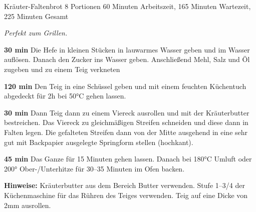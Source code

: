 \begin{recipe}{Kräuter-Faltenbrot} {8 Portionen} {60 Minuten Arbeitszeit, 165 Minuten Wartezeit, 225 Minuten Gesamt}

  \freeform
  \textit{Perfekt zum Grillen.}

  \textbf{30 min}
  Die Hefe in kleinen Stücken in lauwarmes Wasser geben und im Wasser auflösen.
  Danach den Zucker ins Wasser geben.
  Anschließend Mehl, Salz und Öl zugeben und zu einem Teig verkneten

  \newstep
  \textbf{120 min}
  Den Teig in eine Schüssel geben und mit einem feuchten Küchentuch abgedeckt für 2h bei 50°C gehen lassen.

  \textbf{30 min}
  Dann Teig dann zu einem Viereck ausrollen und mit der Kräuterbutter bestreichen.
  Das Viereck zu gleichmäßigen Streifen schneiden und diese dann in Falten legen.
  Die gefalteten Streifen dann von der Mitte ausgehend in eine sehr gut mit Backpapier ausgelegte Springform stellen (hochkant).

  \newstep
  \textbf{45 min}
  Das Ganze für 15 Minuten gehen lassen.
  Danach bei 180°C Umluft oder 200° Ober-/Unterhitze für 30--35 Minuten im Ofen backen.

  \freeform
  \hrulefill

  \freeform
  \textbf{Hinweise:}
  Kräuterbutter aus dem Bereich Butter verwenden.
  Stufe 1--3/4 der Küchenmaschine für das Rühren des Teiges verwenden.
  Teig auf eine Dicke von 2mm ausrollen.

  \end{recipe}
